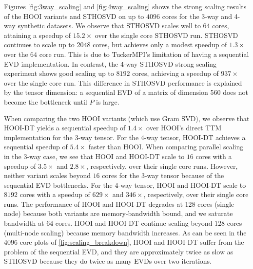     Figures \ref{fig:3way_scaling} and \ref{fig:4way_scaling} shows the strong
    scaling results of the HOOI variants and STHOSVD on up to $4096$ cores for
    the 3-way and 4-way synthetic datasets. We observe that STHOSVD scales well
    to $64$ cores, attaining a speedup of $15.2\times$ over the single core
    STHOSVD run. STHOSVD continues to scale up to $2048$ cores, but achieves
    only a modest speedup of $1.3\times$ over the $64$ core run. This is due to
    TuckerMPI's limitation of having a sequential EVD implementation. In
    contrast, the 4-way STHOSVD strong scaling experiment shows good scaling up
    to $8192$ cores, achieving a speedup of $937\times$ over the single core
    run. This difference in STHOSVD performance is explained by the tensor
    dimension: a sequential EVD of a matrix of dimension 560 does not become the
    bottleneck until $P$ is large.

    When comparing the two HOOI variants (which use Gram SVD), we observe that HOOI-DT yields a
    sequential speedup of $1.4\times$ over HOOI's direct TTM implementation for
    the 3-way tensor. For the 4-way tensor, HOOI-DT achieves a sequential
    speedup of $5.4\times$ faster than HOOI. When comparing parallel scaling in
    the 3-way case, we see that HOOI and HOOI-DT scale to $16$ cores with a
    speedup of $3.5\times$ and $2.8\times$, respectively, over their single core
    runs. However, neither variant scales beyond $16$ cores for the 3-way
    tensor because of the sequential EVD bottlenecks. 
    For the 4-way tensor, HOOI and HOOI-DT scale to $8192$ cores with a
    speedup of $629\times$ and $346\times$, respectively, over their single core
    runs.
    The performance of HOOI and HOOI-DT degrades at $128$ cores (single node)
    because both variants are memory-bandwidth bound, and we saturate bandwidth
    at $64$ cores. HOOI and HOOI-DT continue scaling beyond $128$ cores
    (multi-node scaling) because memory bandwidth increases. 
    As can be seen in the 4096 core plots of \cref{fig:scaling_breakdown},
    HOOI and HOOI-DT suffer from the problem of the sequential EVD, and they are approximately twice as
    slow as STHOSVD because they do twice as many EVDs over two iterations.


